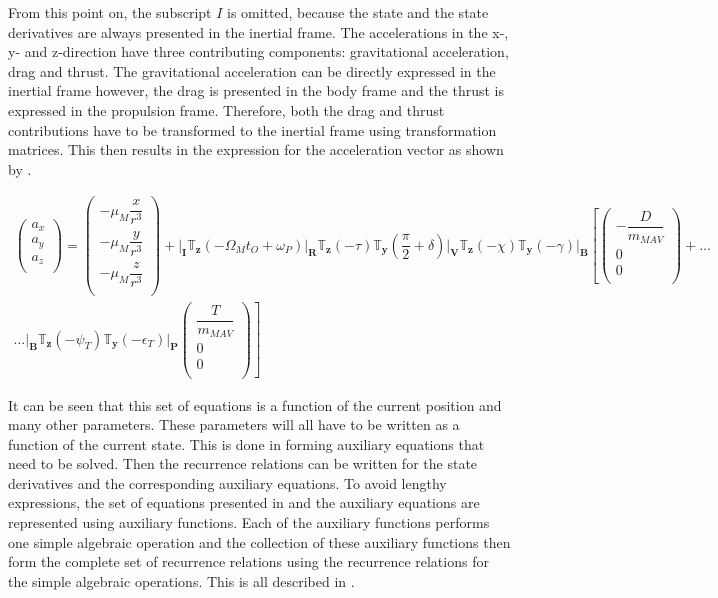 From this point on, the subscript $I$ is omitted, because the state and the state derivatives are always presented in the inertial frame. The accelerations in the x-, y- and z-direction have three contributing components: gravitational acceleration, drag and thrust. The gravitational acceleration can be directly expressed in the inertial frame however, the drag is presented in the body frame and the thrust is expressed in the propulsion frame. Therefore, both the drag and thrust contributions have to be transformed to the inertial frame using transformation matrices. This then results in the expression for the acceleration vector as shown by .

\begin{multline} \label{eq:acc}
\begin{pmatrix}
a_{x}\\
a_{y}\\
a_{z}\\
\end{pmatrix}
=
\begin{pmatrix}
-\mu_{M}\dfrac{x}{r^{3}}\\
-\mu_{M}\dfrac{y}{r^{3}}\\
-\mu_{M}\dfrac{z}{r^{3}}\\
\end{pmatrix}+
\Bigg|_{\mathbf{I}}\mathbb{T}_{\mathbf{z}}\left(-\Omega_{M}t_{O}+\omega_{P}\right)\Bigg|_{\mathbf{R}}\mathbb{T}_{\mathbf{z}}\left(-\tau\right)\mathbb{T}_{\mathbf{y}}\left(\dfrac{\pi}{2}+\delta\right)\Bigg|_{\mathbf{V}}\mathbb{T}_{\mathbf{z}}\left(-\chi\right)\mathbb{T}_{\mathbf{y}}\left(-\gamma\right)\Bigg|_{\mathbf{B}}\left[
\begin{pmatrix}
-\dfrac{D}{m_{MAV}}\\
0\\
0\\
\end{pmatrix}
+  \right. \dots \\
\dotsc
 \left.
\Bigg|_{\mathbf{B}}\mathbb{T}_{\mathbf{z}}\left(-\psi_{T}\right)\mathbb{T}_{\mathbf{y}}\left(-\epsilon_{T}\right)\Bigg|_{\mathbf{P}}
\begin{pmatrix}
\dfrac{T}{m_{MAV}}\\
0\\
0\\
\end{pmatrix}
\right]
\end{multline}

It can be seen that this set of equations is a function of the current position and many other parameters. These parameters will all have to be written as a function of the current state. This is done in  forming auxiliary equations that need to be solved. Then the recurrence relations can be written for the state derivatives and the corresponding auxiliary equations. To avoid lengthy expressions, the set of equations presented in  and the auxiliary equations are represented using auxiliary functions. Each of the auxiliary functions performs one simple algebraic operation and the collection of these auxiliary functions then form the complete set of recurrence relations using the recurrence relations for the simple algebraic operations. This is all described in . 


